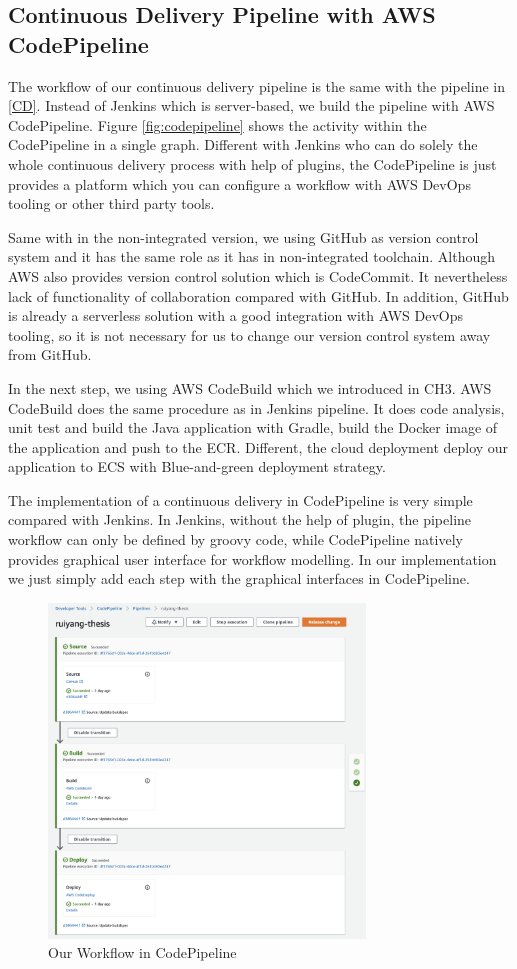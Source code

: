 \subsection{Continuous Delivery Pipeline with AWS CodePipeline}
The workflow of our continuous delivery pipeline is the same with the pipeline in \ref{CD}. Instead of Jenkins which is server-based, we build the pipeline with AWS CodePipeline. Figure \ref{fig:codepipeline} shows the activity within the CodePipeline in a single graph. Different with Jenkins who can do solely the whole continuous delivery process with help of plugins, the CodePipeline is just provides a platform which you can configure a workflow with AWS DevOps tooling or other third party tools. 
\par
Same with in the non-integrated version, we using GitHub as version control system and it has the same role as it has in non-integrated toolchain. Although AWS also provides version control solution which is CodeCommit. It nevertheless lack of functionality of collaboration compared with GitHub. In addition, GitHub is already a serverless solution with a good integration with AWS DevOps tooling, so it is not necessary for us to change our version control system away from GitHub. 
\par
In the next step, we using AWS CodeBuild which we introduced in CH3. AWS CodeBuild does the same procedure as in Jenkins pipeline. It does code analysis, unit test and build the Java application with Gradle, build the Docker image of the application and push to the ECR. Different, the cloud deployment deploy our application to ECS with Blue-and-green deployment strategy.
\par
The implementation of a continuous delivery in CodePipeline is very simple compared with Jenkins. In Jenkins, without the help of plugin, the pipeline workflow can only be defined by groovy code, while CodePipeline natively provides graphical user interface for workflow modelling. In our implementation we just simply add each step with the graphical interfaces in CodePipeline.
\begin{figure}[h]
    \centering
    \includegraphics[width=0.75\textwidth]{pics/cp-interface.png}
    \caption{Our Workflow in CodePipeline}
    \label{fig:cp-edit}
\end{figure}
